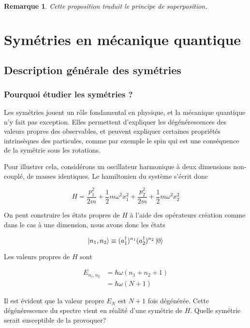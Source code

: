 \documentclass{report}
\numberwithin{equation}{part}
\newtheorem{remark}[theorem]{Remarque}
\begin{document}
\begin{remark}
    Cette proposition traduit le principe de superposition.
\end{remark}


\part{Symétries en mécanique quantique}

\chapter{Description générale des symétries}

\section{Pourquoi étudier les symétries ?}

Les symétries jouent un rôle fondamental en physique, et la mécanique quantique n'y fait pas exception. Elles permettent d'expliquer les dégénérescences des valeurs propres des observables, et peuvent expliquer certaines propriétés intrinsèques des particules, comme par exemple le spin qui est une conséquence de la symétrie sous les rotations.

Pour illustrer cela, considérons un oscillateur harmonique à deux dimensions non-couplé, de masses identiques. Le hamiltonien du système s'écrit donc

\begin{equation}
  H = \frac{p_1^2}{2m} + \frac{1}{2}m\omega^2x_1^2 + \frac{p_2^2}{2m} + \frac{1}{2}m\omega^2x_2^2
\end{equation}

On peut construire les états propres de $H$ à l'aide des opérateurs création comme dans le cas à une dimension, nous avons donc les états 

\begin{equation}
  \ket{n_1, n_2} \equiv (a_1^\dagger)^{n_1} (a_2^\dagger)^{n_2} \ket{0}
\end{equation}

Les valeurs propres de $H$ sont

\begin{align}
  E_{n_1, n_2} &= \hbar\omega(n_1 + n_2 + 1) \\
  &= \hbar\omega (N+1)
\end{align}

Il est évident que la valeur propre $E_N$ est $N+1$ fois dégénérée. Cette dégénérescence du spectre vient en réalité d'une symétrie de $H$. Quelle symétrie serait susceptible de la provoquer?
\end{document}

